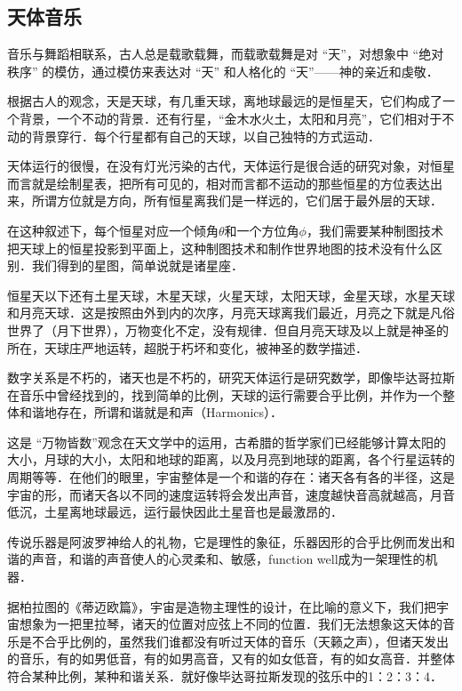 \subsection{天体音乐}

音乐与舞蹈相联系，古人总是载歌载舞，而载歌载舞是对 “天”，对想象中 “绝对秩序” 的模仿，通过模仿来表达对 “天” 和人格化的 “天”——神的亲近和虔敬．

根据古人的观念，天是天球，有几重天球，离地球最远的是恒星天，它们构成了一个背景，一个不动的背景．还有行星，“金木水火土，太阳和月亮”，它们相对于不动的背景穿行．每个行星都有自己的天球，以自己独特的方式运动．

天体运行的很慢，在没有灯光污染的古代，天体运行是很合适的研究对象，对恒星而言就是绘制星表，把所有可见的，相对而言都不运动的那些恒星的方位表达出来，所谓方位就是方向，所有恒星离我们是一样远的，它们居于最外层的天球．

在这种叙述下，每个恒星对应一个倾角$\theta $和一个方位角$\phi $，我们需要某种制图技术把天球上的恒星投影到平面上，这种制图技术和制作世界地图的技术没有什么区别．我们得到的星图，简单说就是诸星座．

恒星天以下还有土星天球，木星天球，火星天球，太阳天球，金星天球，水星天球和月亮天球．这是按照由外到内的次序，月亮天球离我们最近，月亮之下就是凡俗世界了（月下世界），万物变化不定，没有规律．但自月亮天球及以上就是神圣的所在，天球庄严地运转，超脱于朽坏和变化，被神圣的数学描述．

数字关系是不朽的，诸天也是不朽的，研究天体运行是研究数学，即像毕达哥拉斯在音乐中曾经找到的，找到简单的比例，天球的运行需要合乎比例，并作为一个整体和谐地存在，所谓和谐就是和声（Harmonics）．

这是 “万物皆数”观念在天文学中的运用，古希腊的哲学家们已经能够计算太阳的大小，月球的大小，太阳和地球的距离，以及月亮到地球的距离，各个行星运转的周期等等．在他们的眼里，宇宙整体是一个和谐的存在：诸天各有各的半径，这是宇宙的形，而诸天各以不同的速度运转将会发出声音，速度越快音高就越高，月音低沉，土星离地球最远，运行最快因此土星音也是最激昂的．

传说乐器是阿波罗神给人的礼物，它是理性的象征，乐器因形的合乎比例而发出和谐的声音，和谐的声音使人的心灵柔和、敏感，function well成为一架理性的机器．

据柏拉图的《蒂迈欧篇》，宇宙是造物主理性的设计，在比喻的意义下，我们把宇宙想象为一把里拉琴，诸天的位置对应弦上不同的位置．我们无法想象这天体的音乐是不合乎比例的，虽然我们谁都没有听过天体的音乐（天籁之声），但诸天发出的音乐，有的如男低音，有的如男高音，又有的如女低音，有的如女高音．并整体符合某种比例，某种和谐关系．就好像毕达哥拉斯发现的弦乐中的1：2：3：4．

